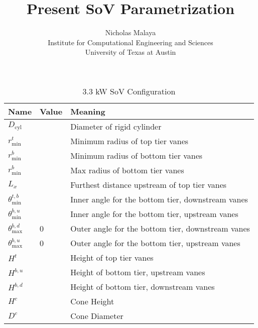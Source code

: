 \documentclass{article}
\title{\bf{Present SoV Parametrization}}
\author{Nicholas Malaya \\ Institute for Computational Engineering and
Sciences \\ University of Texas at Austin} \date{}
\begin{document}
\maketitle

\newpage

\begin{table}[]
\centering
\begin{tabular}{lll}
Name               & Value & Meaning                    \\
 \hline
$D_{\text{cyl}}$            &       & Diameter of rigid cylinder \\
$r^t_{\text{min}}$          &       & Minimum radius of top tier vanes \\
$r^b_{\text{min}}$          &       & Minimum radius of bottom tier vanes \\
$r^b_{\text{min}}$          &       & Max radius of bottom tier vanes \\
       $L_x$                &       & Furthest distance upstream of top
	 tier vanes \\
$\theta_{\text{min}}^{t,b}$ &       & Inner angle for the bottom 
 tier, downstream vanes \\
$\theta_{\text{min}}^{b,u}$ &       & Inner angle for the bottom
 tier, upstream vanes \\
$\theta_{\text{max}}^{b,d}$ &   0   & Outer angle for the bottom 
 tier, downstream vanes \\
$\theta_{\text{max}}^{b,u}$ &   0   & Outer angle for the bottom
 tier, upstream vanes \\
 $H^t    $                    &       & Height of top tier vanes \\
 $H^{b,u}$                    &       & Height of bottom tier, upstream vanes \\
 $H^{b,d}$                    &       & Height of bottom tier, downstream vanes \\
 $H^{c}$                      &       & Cone Height \\
 $D^{c}$                      &       & Cone Diameter
\end{tabular}
\label{my-label}
\caption{3.3 kW SoV Configuration}
\end{table}
\end{document}
